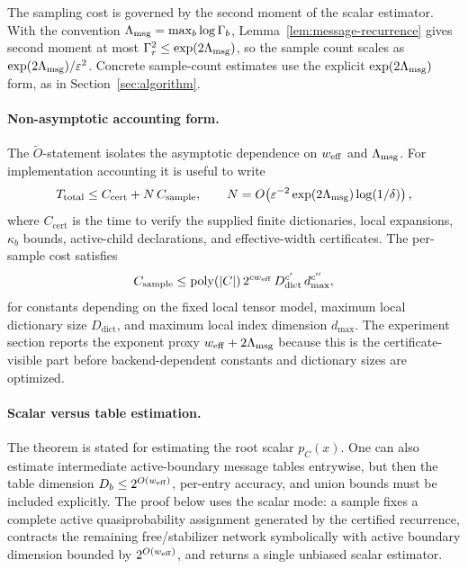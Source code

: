 \begin{remark}
\label{rem:factor-two}
The sampling cost is governed by the second moment of the scalar estimator. With the convention \(\Lambda_{\mathrm{msg}}=\max_b\log\Gamma_b\), Lemma~\ref{lem:message-recurrence} gives second moment at most \(\Gamma_r^2\le\exp(2\Lambda_{\mathrm{msg}})\), so the sample count scales as \(\exp(2\Lambda_{\mathrm{msg}})/\varepsilon^2\). Concrete sample-count estimates use the explicit \(\exp(2\Lambda_{\mathrm{msg}})\) form, as in Section~\ref{sec:algorithm}.
\end{remark}

\paragraph{Non-asymptotic accounting form.}
The \(\widetilde O\)-statement isolates the asymptotic dependence on \(w_{\mathrm{eff}}\) and \(\Lambda_{\mathrm{msg}}\). For implementation accounting it is useful to write
\[
T_{\mathrm{total}}
\le C_{\mathrm{cert}}+
N\,C_{\mathrm{sample}},
\qquad
N=
O\!\left(\varepsilon^{-2}\exp(2\Lambda_{\mathrm{msg}})\log(1/\delta)\right),
\]
where \(C_{\mathrm{cert}}\) is the time to verify the supplied finite dictionaries, local expansions, \(\kappa_b\) bounds, active-child declarations, and effective-width certificates. The per-sample cost satisfies
\[
C_{\mathrm{sample}}
\le \operatorname{poly}(|C|)\,2^{cw_{\mathrm{eff}}}\,D_{\mathrm{dict}}^{c'}\,d_{\max}^{c''},
\]
for constants depending on the fixed local tensor model, maximum local dictionary size \(D_{\mathrm{dict}}\), and maximum local index dimension \(d_{\max}\). The experiment section reports the exponent proxy \(w_{\mathrm{eff}}+2\Lambda_{\mathrm{msg}}\) because this is the certificate-visible part before backend-dependent constants and dictionary sizes are optimized.

\paragraph{Scalar versus table estimation.}
The theorem is stated for estimating the root scalar \(p_C(x)\). One can also estimate intermediate active-boundary message tables entrywise, but then the table dimension \(D_b\le 2^{O(w_{\mathrm{eff}})}\), per-entry accuracy, and union bounds must be included explicitly. The proof below uses the scalar mode: a sample fixes a complete active quasiprobability assignment generated by the certified recurrence, contracts the remaining free/stabilizer network symbolically with active boundary dimension bounded by \(2^{O(w_{\mathrm{eff}})}\), and returns a single unbiased scalar estimator.

